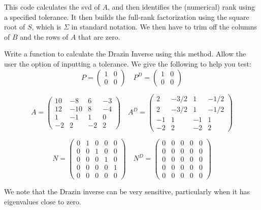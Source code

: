 This code calculates the svd of $A$, and then identifies the (numerical) rank using a specified tolerance. It then builds the full-rank factorization using the square root of $S$, which is $\Sigma$ in standard notation. We then have to trim off the columns of $B$ and the rows of $A$ that are zero.

\begin{problem}
Write a function to calculate the Drazin Inverse using this method. Allow the user the option of inputting a tolerance. We give the following to help you test:
\[
P = \begin{pmatrix}
1 & 0 \\
0 & 0 
\end{pmatrix} \quad P^D = \begin{pmatrix}
1 & 0 \\
0 & 0 
\end{pmatrix}
\]

\[
A = \begin{pmatrix}
10 & -8 & 6 & -3 \\
12 & -10 & 8 & -4 \\
1 & -1 & 1 & 0 \\
-2 & 2 & -2 & 2
\end{pmatrix} \quad A^D = \begin{pmatrix}
2 & -3/2 & 1 & -1/2 \\
2 & -3/2 & 1 & -1/2 \\
-1 & 1 & -1 & 1 \\
-2 & 2 & -2 & 2
\end{pmatrix}
\]

\[
N = \begin{pmatrix}
0&1&0&0&0 \\
0&0&1&0&0 \\
0&0&0&1&0 \\
0&0&0&0&1 \\
0&0&0&0&0
\end{pmatrix} \quad N^D = \begin{pmatrix}
0&0&0&0&0 \\
0&0&0&0&0 \\
0&0&0&0&0 \\
0&0&0&0&0 \\
0&0&0&0&0
\end{pmatrix}
\]
\end{problem}

We note that the Drazin inverse can be very sensitive, particularly when it has eigenvalues close to zero.

